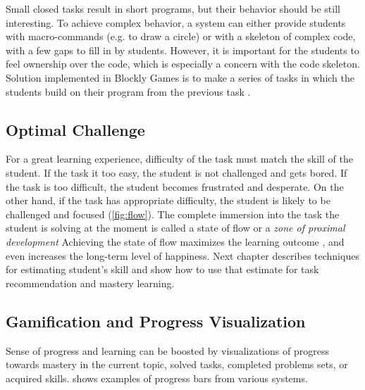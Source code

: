 Small closed tasks result in short programs,
  but their behavior should be still interesting. %
To achieve complex behavior,
  a system can either provide students with macro-commands (e.g. to draw a circle)
  or with a skeleton of complex code, with a few gaps to fill in by students.
However, it is important for the students to feel ownership over the code,
  which is especially a concern with the code skeleton.
Solution implemented in Blockly Games
  is to make a series of tasks in which the students
  build on their program from the previous task
  \cite{blockly-10-things}.



\subsection{Optimal Challenge}  %
\label{sec:motivation.challenge}
For a great learning experience,
  difficulty of the task must match the skill of the student.
If the task it too easy,
  the student is not challenged and gets bored.
If the task is too difficult,
  the student becomes frustrated and desperate.
On the other hand, if the task has appropriate difficulty,
  the student is likely to be challenged and focused
  (\cref{fig:flow}).
The complete immersion into the task the student is solving at the moment is called
  a state of flow \cite{flow}
  or a \emph{zone of proximal development} \cite{zone-of-proximal-development}
Achieving the state of flow maximizes the learning outcome \cite{adaptive-practice},
  and even increases the long-term level of happiness. %
Next chapter describes techniques for estimating student’s skill
  and show how to use that estimate for task recommendation and mastery learning.


\subsection{Gamification and Progress Visualization}

Sense of progress and learning can be boosted by visualizations of
progress towards mastery in the current topic, solved tasks, completed problems sets,
or acquired skills.
 shows examples of progress bars from various systems.


